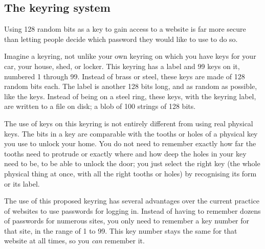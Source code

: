 \subsection{The keyring system}
Using 128 random bits as a key to gain access to a website is far more secure than letting people decide which password they would like to use to do so.
\par
Imagine a keyring, not unlike your own keyring on which you have keys for your car, your house, shed, or locker.
This keyring has a label and 99 keys on it, numbered 1 through 99.
Instead of brass or steel, these keys are made of 128 random bits each.
The label is another 128 bits long, and as random as possible, like the keys.
Instead of being on a steel ring, these keys, with the keyring label, are written to a file on disk; a blob of 100 strings of 128 bits.
\par
The use of keys on this keyring is not entirely different from using real physical keys.
The bits in a key are comparable with the tooths or holes of a physical key you use to unlock your home.
You do not need to remember exactly how far the tooths need to protrude or exactly where and how deep the holes in your key need to be, to be able to unlock the door;
you just select the right key
(the whole physical thing at once, with all the right tooths or holes)
by recognising its form or its label.
\par
The use of this proposed keyring has several advantages over the current practice of websites to use passwords for logging in.
Instead of having to remember dozens of passwords for numerous sites,
you only need to remember a key number for that site, in the range of 1 to 99.
This key number stays the same for that website at all times, so you \emph{can} remember it.

